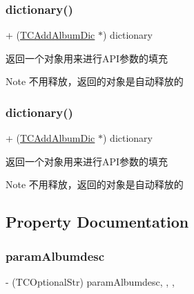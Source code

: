 \subsubsection{\texorpdfstring{dictionary()}{dictionary()}\hspace{0.1cm}{\footnotesize\ttfamily [1/2]}}
{\footnotesize\ttfamily + (\mbox{\hyperlink{interface_t_c_add_album_dic}{T\+C\+Add\+Album\+Dic}} $\ast$) dictionary \begin{DoxyParamCaption}{ }\end{DoxyParamCaption}}

返回一个对象用来进行\+A\+P\+I参数的填充

\begin{DoxyNote}{Note}
不用释放，返回的对象是自动释放的 
\end{DoxyNote}
\mbox{\label{interface_t_c_add_album_dic_a4b8ff75155d90460265eb375106d0c3e}} 
\subsubsection{\texorpdfstring{dictionary()}{dictionary()}\hspace{0.1cm}{\footnotesize\ttfamily [2/2]}}
{\footnotesize\ttfamily + (\mbox{\hyperlink{interface_t_c_add_album_dic}{T\+C\+Add\+Album\+Dic}} $\ast$) dictionary \begin{DoxyParamCaption}{ }\end{DoxyParamCaption}}

返回一个对象用来进行\+A\+P\+I参数的填充

\begin{DoxyNote}{Note}
不用释放，返回的对象是自动释放的 
\end{DoxyNote}


\subsection{Property Documentation}
\mbox{\label{interface_t_c_add_album_dic_a29c5ee5de3c66e786658c5f90b2af24d}} 
\subsubsection{\texorpdfstring{param\+Albumdesc}{paramAlbumdesc}}
{\footnotesize\ttfamily -\/ (T\+C\+Optional\+Str) param\+Albumdesc\hspace{0.3cm}{\ttfamily [read]}, {\ttfamily [write]}, {\ttfamily [nonatomic]}, {\ttfamily [retain]}}

